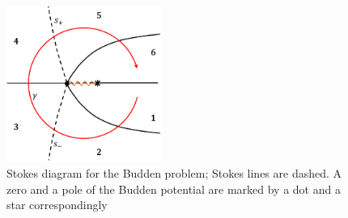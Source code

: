 \documentclass[aip,jmp,reprint]{revtex4-1}
\def\mytextwidth{0.45\textwidth}
\begin{document}
\begin{figure}
\centering
\noindent
\includegraphics[width=\mytextwidth]{stuff/sd.png}
\caption
{Stokes diagram for the Budden problem; Stokes lines are dashed.
A zero and a pole of the Budden potential are marked by a dot and a star correspondingly}
\label{fig:diagram}
\end{figure} 
\end{document}
